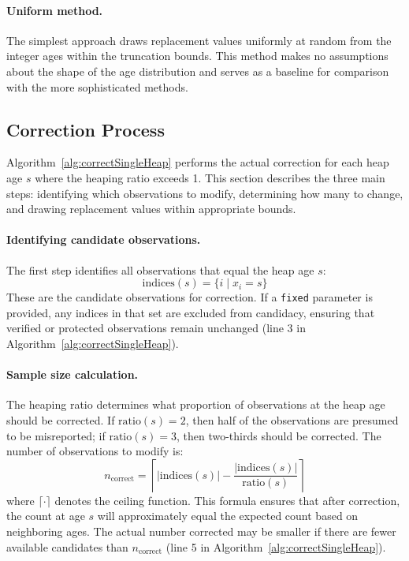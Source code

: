 \documentclass[pdflatex,sn-mathphys-num]{sn-jnl}%
\theoremstyle{thmstyleone}%
\theoremstyle{thmstyletwo}%
\theoremstyle{thmstylethree}%
\begin{document}
\paragraph{Uniform method.} The simplest approach draws replacement values uniformly at random from the integer ages within the truncation bounds. This method makes no assumptions about the shape of the age distribution and serves as a baseline for comparison with the more sophisticated methods.

\subsection{Correction Process}\label{sec:correction}

Algorithm~\ref{alg:correctSingleHeap} performs the actual correction for each heap age $s$ where the heaping ratio exceeds 1. This section describes the three main steps: identifying which observations to modify, determining how many to change, and drawing replacement values within appropriate bounds.

\paragraph{Identifying candidate observations.}
The first step identifies all observations that equal the heap age $s$:
\[
\text{indices}(s) = \{i \mid x_i = s\}
\]
These are the candidate observations for correction. If a \texttt{fixed} parameter is provided, any indices in that set are excluded from candidacy, ensuring that verified or protected observations remain unchanged (line 3 in Algorithm~\ref{alg:correctSingleHeap}).

\paragraph{Sample size calculation.}
The heaping ratio determines what proportion of observations at the heap age should be corrected. If $\text{ratio}(s) = 2$, then half of the observations are presumed to be misreported; if $\text{ratio}(s) = 3$, then two-thirds should be corrected. The number of observations to modify is:
\[
n_{\text{correct}} = \left\lceil |\text{indices}(s)| - \frac{|\text{indices}(s)|}{\text{ratio}(s)} \right\rceil
\]
where $\lceil \cdot \rceil$ denotes the ceiling function. This formula ensures that after correction, the count at age $s$ will approximately equal the expected count based on neighboring ages. The actual number corrected may be smaller if there are fewer available candidates than $n_{\text{correct}}$ (line 5 in Algorithm~\ref{alg:correctSingleHeap}).
\end{document}
